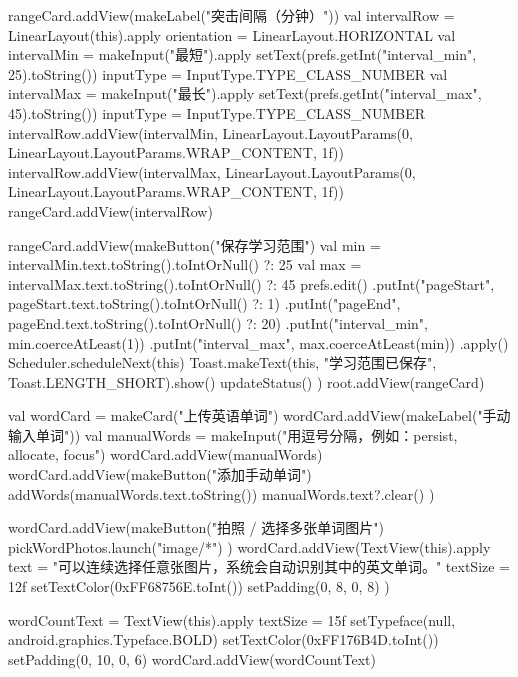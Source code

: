 {{        rangeCard.addView(makeLabel("突击间隔（分钟）"))
        val intervalRow = LinearLayout(this).apply { orientation = LinearLayout.HORIZONTAL }
        val intervalMin = makeInput("最短").apply {
            setText(prefs.getInt("interval_min", 25).toString())
            inputType = InputType.TYPE_CLASS_NUMBER
        }
        val intervalMax = makeInput("最长").apply {
            setText(prefs.getInt("interval_max", 45).toString())
            inputType = InputType.TYPE_CLASS_NUMBER
        }
        intervalRow.addView(intervalMin, LinearLayout.LayoutParams(0, LinearLayout.LayoutParams.WRAP_CONTENT, 1f))
        intervalRow.addView(intervalMax, LinearLayout.LayoutParams(0, LinearLayout.LayoutParams.WRAP_CONTENT, 1f))
        rangeCard.addView(intervalRow)

        rangeCard.addView(makeButton("保存学习范围") {
            val min = intervalMin.text.toString().toIntOrNull() ?: 25
            val max = intervalMax.text.toString().toIntOrNull() ?: 45
            prefs.edit()
                .putInt("pageStart", pageStart.text.toString().toIntOrNull() ?: 1)
                .putInt("pageEnd", pageEnd.text.toString().toIntOrNull() ?: 20)
                .putInt("interval_min", min.coerceAtLeast(1))
                .putInt("interval_max", max.coerceAtLeast(min))
                .apply()
            Scheduler.scheduleNext(this)
            Toast.makeText(this, "学习范围已保存", Toast.LENGTH_SHORT).show()
            updateStatus()
        })
        root.addView(rangeCard)

        val wordCard = makeCard("上传英语单词")
        wordCard.addView(makeLabel("手动输入单词"))
        val manualWords = makeInput("用逗号分隔，例如：persist, allocate, focus")
        wordCard.addView(manualWords)
        wordCard.addView(makeButton("添加手动单词") {
            addWords(manualWords.text.toString())
            manualWords.text?.clear()
        })

        wordCard.addView(makeButton("拍照 / 选择多张单词图片") {
            pickWordPhotos.launch("image/*")
        })
        wordCard.addView(TextView(this).apply {
            text = "可以连续选择任意张图片，系统会自动识别其中的英文单词。"
            textSize = 12f
            setTextColor(0xFF68756E.toInt())
            setPadding(0, 8, 0, 8)
        })

        wordCountText = TextView(this).apply {
            textSize = 15f
            setTypeface(null, android.graphics.Typeface.BOLD)
            setTextColor(0xFF176B4D.toInt())
            setPadding(0, 10, 0, 6)
        }
        wordCard.addView(wordCountText)

}}
